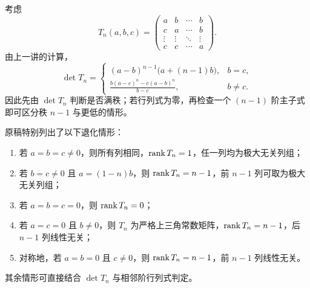 考虑
\begin{equation}
 T_n(a,b,c)=
 \begin{pmatrix}
 a&b&\cdots&b\\
 c&a&\cdots&b\\
 \vdots&\vdots&\ddots&\vdots\\
 c&c&\cdots&a
 \end{pmatrix}.
\end{equation}
由上一讲的计算，
\begin{equation}
 \det T_n=
 \begin{cases}
 (a-b)^{n-1}\bigl(a+(n-1)b\bigr),&b=c,\\[0.4em]
 \displaystyle\frac{b(a-c)^n-c(a-b)^n}{b-c},&b\neq c.
 \end{cases}
\end{equation}
因此先由 $\det T_n$ 判断是否满秩；若行列式为零，再检查一个 $(n-1)$ 阶主子式即可区分秩 $n-1$ 与更低的情形。

原稿特别列出了以下退化情形：
\begin{enumerate}
  \item 若 $a=b=c\neq0$，则所有列相同，$\operatorname{rank} T_n=1$，任一列均为极大无关列组；
  \item 若 $b=c\neq0$ 且 $a=(1-n)b$，则 $\operatorname{rank} T_n=n-1$，前 $n-1$ 列可取为极大无关列组；
  \item 若 $a=b=c=0$，则 $\operatorname{rank} T_n=0$；
  \item 若 $a=c=0$ 且 $b\neq0$，则 $T_n$ 为严格上三角常数矩阵，$\operatorname{rank} T_n=n-1$，后 $n-1$ 列线性无关；
  \item 对称地，若 $a=b=0$ 且 $c\neq0$，则 $\operatorname{rank} T_n=n-1$，前 $n-1$ 列线性无关。
\end{enumerate}
其余情形可直接结合 $\det T_n$ 与相邻阶行列式判定。
